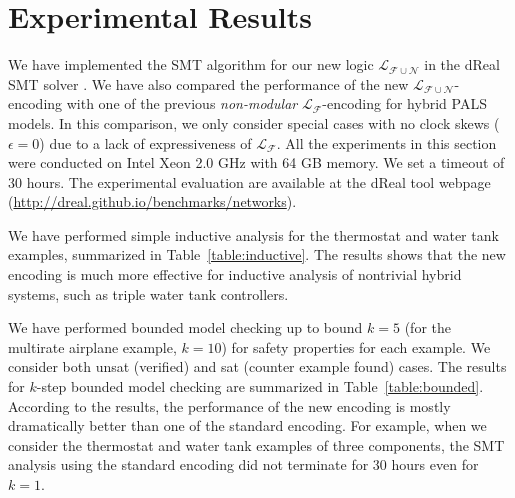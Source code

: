 
\section{Experimental Results}
\label{sec:expr}

We have implemented the SMT algorithm
for our new logic $\mathcal{L}_{\mathcal{F}\cup\mathcal{N}}$ in the dReal SMT solver \cite{dReal}.
%
We have also compared the performance of 
the new $\mathcal{L}_{\mathcal{F}\cup\mathcal{N}}$-encoding
with one of the previous \emph{non-modular} $\mathcal{L}_{\mathcal{F}}$-encoding  for hybrid PALS models.
In this comparison,
we only consider special cases %
with no clock skews ($\epsilon = 0$) 
due to a lack of expressiveness of  $\mathcal{L}_{\mathcal{F}}$.
All the experiments in this section
were conducted on Intel Xeon 2.0 GHz with 64 GB memory.
We set a timeout of 30 hours. %
The experimental evaluation are available at the \textsf{dReal} tool webpage (\url{http://dreal.github.io/benchmarks/networks}).




We have performed simple inductive analysis
for the thermostat and water tank examples,
summarized in Table~\ref{table:inductive}.
The results shows that the new encoding is much more effective for 
inductive analysis of nontrivial hybrid systems,
such as triple water tank controllers.

We have performed bounded model checking up to bound $k = 5$
(for the multirate airplane example, $k = 10$)
for safety properties for each example. We consider both unsat (verified) and sat 
(counter example found) cases.
The results for $k$-step bounded model checking 
are summarized  in Table~\ref{table:bounded}.
%
According to the results, the performance of the new encoding %
is mostly dramatically better than one of the standard encoding.
For example, 
when we consider the thermostat and water tank examples of three components, 
the SMT analysis using the standard encoding did not terminate for $30$ hours
even for $k = 1$.
%
%


